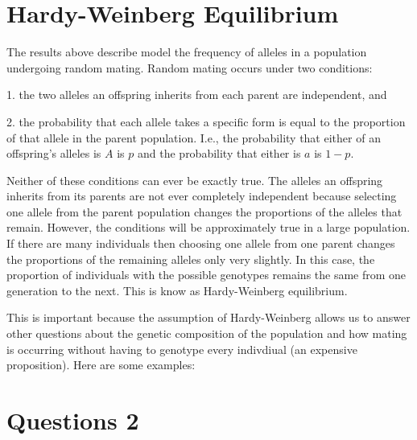 \documentclass[addpoints,answers]{exam}
\begin{document}
\section*{Hardy-Weinberg Equilibrium}

The results above describe model the frequency of alleles in a population undergoing random mating. Random mating occurs under two conditions:

  1. the two alleles an offspring inherits from each parent are independent, and

  2. the probability that each allele takes a specific form is equal to the proportion of that allele in the parent population. I.e., the probability that either of an offspring's alleles is $A$ is $p$ and the probability that either is $a$ is $1-p$. 
  
Neither of these conditions can ever be exactly true. The alleles an offspring inherits from its parents are not ever completely independent because selecting one allele from the parent population changes the proportions of the alleles that remain. However, the conditions will be approximately true in a large population. If there are many individuals then choosing one allele from one parent changes the proportions of the remaining alleles only very slightly. In this case, the proportion of individuals with the possible genotypes remains the same from one generation to the next. This is know as Hardy-Weinberg equilibrium.
  
This is important because the assumption of Hardy-Weinberg allows us to answer other questions about the genetic composition of the population and how mating is occurring without having to genotype every indivdiual (an expensive proposition). Here are some examples:

\section*{Questions 2}
\end{document}
